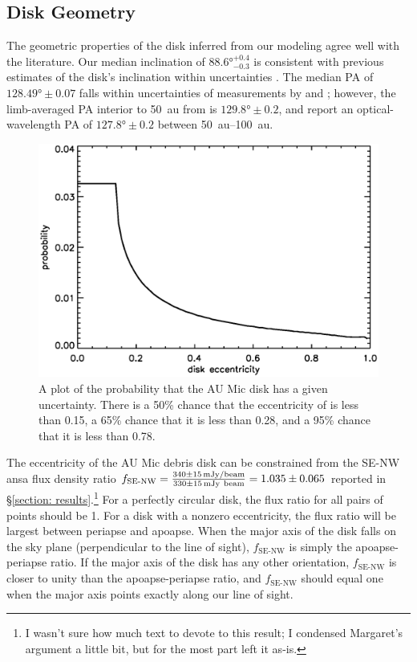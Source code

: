 \documentclass[modern]{aastex62}
\begin{document}
\subsection{Disk Geometry}
\label{subsection: disk geometry}

The geometric properties of the disk inferred from our modeling agree well with the literature. 
Our median inclination of $\ang[angle-symbol-over-decimal]{88.6}^{+0.4}_{-0.3}$ is consistent with previous estimates of the disk's inclination within uncertainties \citep{metchev05,krist05}.
The median PA of $\ang[angle-symbol-over-decimal]{128.49} \pm 0.07$ falls within uncertainties of measurements by \citet{macgregor13} and \citet{krist05}; however, the limb-averaged PA interior to \SI{50}{au} from \citet{metchev05} is $\ang[angle-symbol-over-decimal]{129.8} \pm 0.2$, and \citet{schneider14} report an optical-wavelength PA of $\ang[angle-symbol-over-decimal]{127.8} \pm 0.2$ between \SIrange{50}{100}{au}.

\begin{figure}
  \centering
  \includegraphics[width=\linewidth]{../figures/eccdiffprobplot.eps}
  \caption{
    A plot of the probability that the AU Mic disk has a given uncertainty.
    There is a 50\% chance that the eccentricity of is less than 0.15, a 65\% chance that it is less than 0.28, and a 95\% chance that it is less than 0.78.
  }
  \label{fig: eccentricity}
\end{figure}

The eccentricity of the AU Mic debris disk can be constrained from the SE-NW ansa flux density ratio $f_{\text{SE-NW}} = \frac{\SI{340 \pm 15}{mJy / beam}}{\SI{330 \pm 15}{mJy \ beam}} = \num{1.035 \pm 0.065}$ reported in \S \ref{section: results}.\footnote{I wasn't sure how much text to devote to this result; I condensed Margaret's argument a little bit, but for the most part left it as-is.}
For a perfectly circular disk, the flux ratio for all pairs of points should be 1. 
For a disk with a nonzero eccentricity, the flux ratio will be largest between periapse and apoapse. 
When the major axis of the disk falls on the sky plane (perpendicular to the line of sight), $f_{\text{SE-NW}}$ is simply the apoapse-periapse ratio. 
If the major axis of the disk has any other orientation, $f_{\text{SE-NW}}$ is closer to unity than the apoapse-periapse ratio, and $f_{\text{SE-NW}}$ should equal one when the major axis points exactly along our line of sight.
\end{document}
